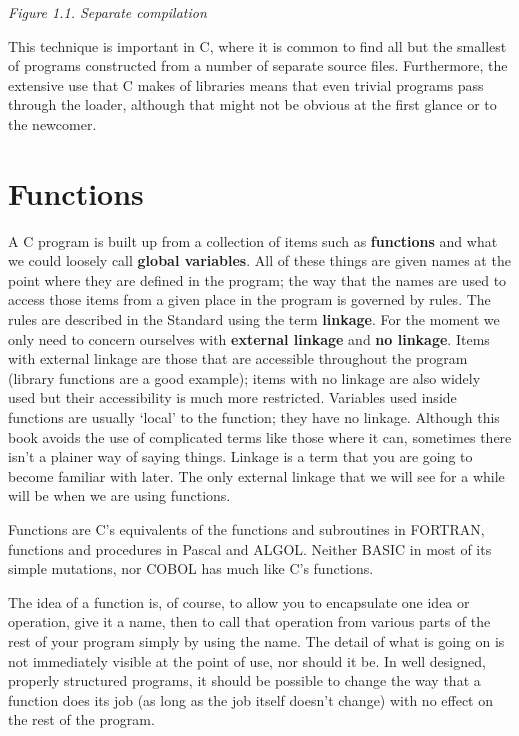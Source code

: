 \begin{center}\textit{Figure 1.1. Separate compilation}\end{center}


  This technique is important in C, where it is common to find all but the
   smallest of programs constructed from a number of separate source files.
   Furthermore, the extensive use that C makes of libraries means that even
   trivial programs pass through the loader, although that might not be obvious
   at the first glance or to the newcomer.


 
        \section{Functions}
        

  

  A C program is built up from a collection of items such as
   \textbf{functions} and what we could loosely call \textbf{global
   variables}. All of these things are given names at the point where they
   are defined in the program; the way that the names are used to access those
   items from a given place in the program is governed by rules. The rules are
   described in the Standard using the term \textbf{linkage}. For the moment
   we only need to concern ourselves with \textbf{external linkage} and
   \textbf{no linkage}. Items with external linkage are those that are
   accessible throughout the program (library functions are a good example);
   items with no linkage are also widely used but their accessibility is much
   more restricted. Variables used inside functions are usually `local'
   to the function; they have no linkage. Although this book avoids the use of
   complicated terms like those where it can, sometimes there isn't a plainer
   way of saying things. Linkage is a term that you are going to become
   familiar with later. The only external linkage that we will see for a while
   will be when we are using functions.


  Functions are C's equivalents of the functions and subroutines in FORTRAN,
   functions and procedures in Pascal and ALGOL. Neither BASIC in most of its
   simple mutations, nor COBOL has much like C's functions.


  The idea of a function is, of course, to allow you to encapsulate one idea
   or operation, give it a name, then to call that operation from various parts
   of the rest of your program simply by using the name. The detail of what is
   going on is not immediately visible at the point of use, nor should it
   be. In well designed, properly structured programs, it should be possible to
   change the way that a function does its job (as long as the job itself
   doesn't change) with no effect on the rest of the program.


